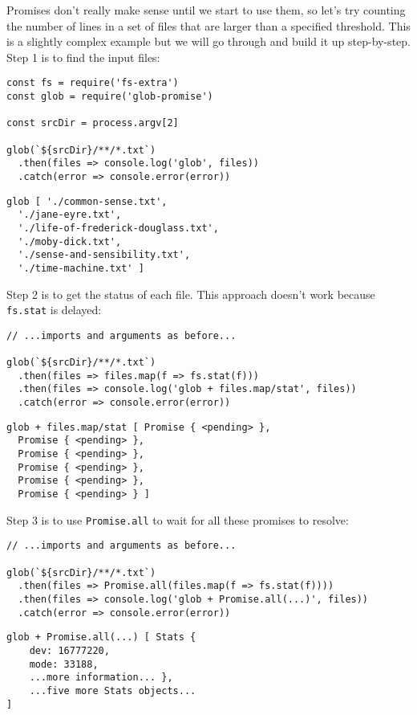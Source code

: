 Promises don't really make sense until we start to use them,
so let's try counting the number of lines in a set of files
that are larger than a specified threshold.
This is a slightly complex example but we will go through and build it up step-by-step.
Step 1 is to find the input files:

\begin{verbatim}
const fs = require('fs-extra')
const glob = require('glob-promise')

const srcDir = process.argv[2]

glob(`${srcDir}/**/*.txt`)
  .then(files => console.log('glob', files))
  .catch(error => console.error(error))
\end{verbatim}

\begin{verbatim}
glob [ './common-sense.txt',
  './jane-eyre.txt',
  './life-of-frederick-douglass.txt',
  './moby-dick.txt',
  './sense-and-sensibility.txt',
  './time-machine.txt' ]
\end{verbatim}

Step 2 is to get the status of each file.
This approach doesn't work because \texttt{fs.stat} is delayed:

\begin{verbatim}
// ...imports and arguments as before...

glob(`${srcDir}/**/*.txt`)
  .then(files => files.map(f => fs.stat(f)))
  .then(files => console.log('glob + files.map/stat', files))
  .catch(error => console.error(error))
\end{verbatim}

\begin{verbatim}
glob + files.map/stat [ Promise { <pending> },
  Promise { <pending> },
  Promise { <pending> },
  Promise { <pending> },
  Promise { <pending> },
  Promise { <pending> } ]
\end{verbatim}

Step 3 is to use \texttt{Promise.all} to wait for all these promises to resolve:

\begin{verbatim}
// ...imports and arguments as before...

glob(`${srcDir}/**/*.txt`)
  .then(files => Promise.all(files.map(f => fs.stat(f))))
  .then(files => console.log('glob + Promise.all(...)', files))
  .catch(error => console.error(error))
\end{verbatim}

\begin{verbatim}
glob + Promise.all(...) [ Stats {
    dev: 16777220,
    mode: 33188,
    ...more information... },
    ...five more Stats objects...
]
\end{verbatim}

